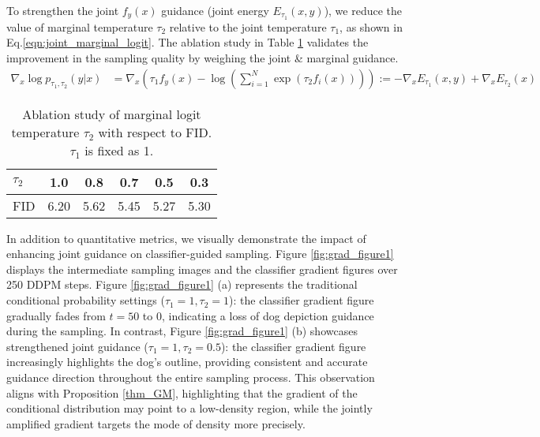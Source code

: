 \documentclass{article}
\theoremstyle{definition}
\begin{document}
To strengthen the joint $f_y(x)$ guidance (joint energy $E_{\tau_1}(x,y)$), we reduce the value of marginal temperature $\tau_2$ relative to the joint temperature $\tau_1$, as shown in Eq.\eqref{eqn:joint_marginal_logit}. The ablation study in Table \ref{table:ablation_temp2} validates the improvement in the sampling quality by weighing the joint \& marginal guidance. 
\begin{equation}
\begin{aligned}
\label{eqn:joint_marginal_logit}
\nabla_x \log p_{\tau_1,\tau_2}(y|x) & = \nabla_x (\tau_1f_y(x) - \log(\sum^N_{i=1} \exp(\tau_2f_i(x)))) 
:= -\nabla_x E_{\tau_1}(x,y) + \nabla_x E_{\tau_2}(x)
\end{aligned}
\end{equation}
\begin{table}[h!]
\caption{Ablation study of marginal logit temperature $\tau_2$ with respect to FID. $\tau_1$ is fixed as 1.}
\label{table:ablation_temp2}
\begin{center}
\begin{small}
\begin{sc}
\begin{tabular}{lccccc}
\toprule
  $\tau_2$   & 1.0 & 0.8 & 0.7 & 0.5 & 0.3  \\
\midrule
FID     & 6.20 & 5.62 & 5.45 & 5.27 & 5.30 \\
\bottomrule
\end{tabular}
\end{sc}
\end{small}
\end{center}
\end{table}




In addition to quantitative metrics, we visually demonstrate the impact of enhancing joint guidance on classifier-guided sampling.
Figure \ref{fig:grad_figure1} displays the intermediate sampling images and the classifier gradient figures over 250 DDPM steps. Figure \ref{fig:grad_figure1} (a) represents the traditional conditional probability settings ($\tau_1=1,\tau_2=1$): the classifier gradient figure gradually fades from $t=50$ to 0, indicating a loss of dog depiction guidance during the sampling. In contrast, Figure \ref{fig:grad_figure1} (b) 
showcases strengthened joint guidance ($\tau_1=1,\tau_2=0.5$): the classifier gradient figure increasingly highlights the dog's outline, providing consistent and accurate guidance direction throughout the entire sampling process.
This observation aligns with Proposition \ref{thm_GM}, highlighting that the gradient of the conditional distribution may point to a low-density region, while the jointly amplified gradient targets the mode of density more precisely.
\end{document}
